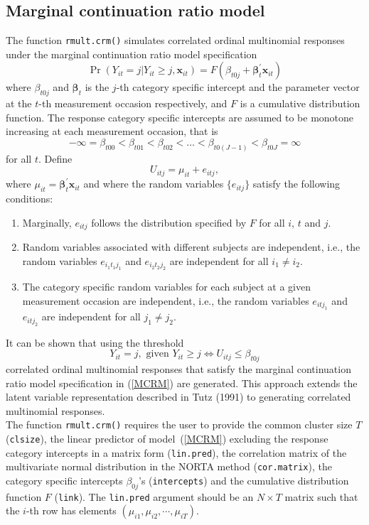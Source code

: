 \documentclass{article}
\begin{document}
\subsection{Marginal continuation ratio model}
The function \texttt{rmult.crm()} simulates correlated ordinal multinomial responses under the marginal continuation ratio model specification
\begin{equation}
\Pr(Y_{it}=j |Y_{it} \ge j,\mathbf {x}_{it})=F(\beta_{t0j} +\boldsymbol {\beta}^{'}_t \mathbf {x}_{it})
\label{MCRM}
\end{equation}
where $\beta_{t0j}$ and $\boldsymbol \beta_t$ is the $j$-th category specific intercept and the parameter vector at the $t$-th measurement occasion respectively, and $F$ is a cumulative distribution function. The response category specific intercepts are assumed to be monotone increasing at each measurement occasion, that is
$$-\infty=\beta_{t00} <\beta_{t01} < \beta_{t02} < \ldots < \beta_{t0(J-1)}< \beta_{t0J}=\infty$$
for all $t$.
Define 
$$U_{itj}=\mu_{it}+e_{itj},$$
where $\mu_{it}=\boldsymbol {\beta}^{\prime}_t \mathbf {x}_{it}$ and where the random variables $\{e_{itj}\}$ satisfy the following conditions:
\begin{enumerate}
\item Marginally, $e_{itj}$ follows the distribution specified by $F$ for all $i$, $t$ and $j$.
\item Random variables associated with different subjects are independent, i.e., the random variables $e_{i_1t_1j_1}$ and $e_{i_2t_2j_2}$ are independent for all $i_1 \neq i_2$.
\item The category specific random variables for each subject at a given measurement occasion are independent, i.e., the random variables $e_{itj_1}$ and $e_{itj_2}$ are independent for all $j_1\neq j_2$.
\end{enumerate}
It can be shown that using the threshold
$$Y_{it}=j, \text{ given } Y_{it} \geq j \Leftrightarrow U_{itj} \leq \beta_{t0j}$$
correlated ordinal multinomial responses that satisfy the marginal continuation ratio model specification in (\ref{MCRM}) are generated. This approach extends the latent variable representation described in Tutz (1991) to generating correlated multinomial responses.\\
\indent The function \texttt{rmult.crm()} requires the user to provide the common cluster size $T$ (\texttt{clsize}), the linear predictor of model~(\ref{MCRM}) excluding the response category intercepts in a matrix form (\texttt{lin.pred}), the correlation matrix of the multivariate normal distribution in the NORTA method (\texttt{cor.matrix}), the category specific intercepts $\beta_{0j}$'s (\texttt{intercepts}) and the cumulative distribution function $F$ (\texttt{link}). The \texttt{lin.pred} argument should be an $N \times T$ matrix such that the $i$-th row has elements $(\mu_{i1},\mu_{i2},\cdots,\mu_{iT})$.\\
\end{document}
